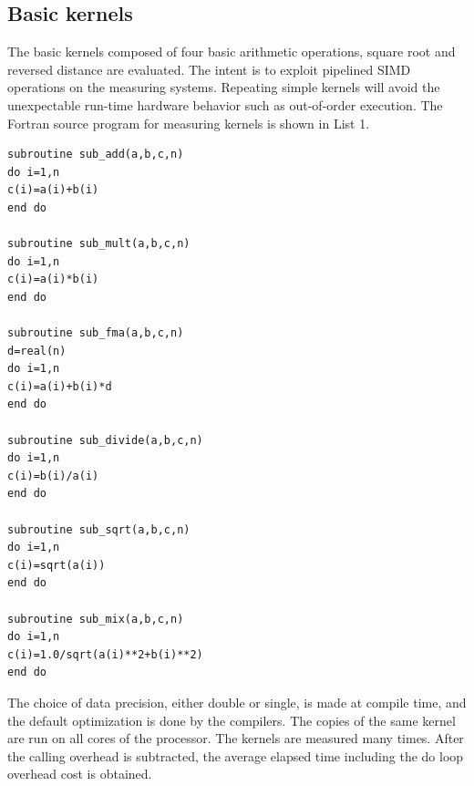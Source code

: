 \documentclass[conference]{IEEEtran}
\begin{document}
\begin{table}[tb]
\end{table}

%
\subsection{Basic kernels}
\label{subsection:basic-kernels}

The basic kernels composed of four basic arithmetic operations, square root
and reversed distance are evaluated.
The intent is to exploit pipelined SIMD operations on the measuring systems.
Repeating simple kernels will avoid the unexpectable run-time hardware behavior
such as out-of-order execution.
The Fortran source program for measuring kernels is shown in List 1.

\begin{lstlisting}[caption={basic kernels (partial list)}]
subroutine sub_add(a,b,c,n)
do i=1,n
c(i)=a(i)+b(i)
end do

subroutine sub_mult(a,b,c,n)
do i=1,n
c(i)=a(i)*b(i)
end do

subroutine sub_fma(a,b,c,n)
d=real(n)
do i=1,n
c(i)=a(i)+b(i)*d
end do

subroutine sub_divide(a,b,c,n)
do i=1,n
c(i)=b(i)/a(i)
end do

subroutine sub_sqrt(a,b,c,n)
do i=1,n
c(i)=sqrt(a(i))
end do

subroutine sub_mix(a,b,c,n)
do i=1,n
c(i)=1.0/sqrt(a(i)**2+b(i)**2)
end do
\end{lstlisting}

The choice of data precision, either double or single, is made at compile time,
and the default optimization is done by the compilers.
The copies of the same kernel are run on all cores of the processor.
The kernels are measured many times. After the calling overhead is subtracted,
the average elapsed time including the do loop overhead cost is obtained.
\end{document}
